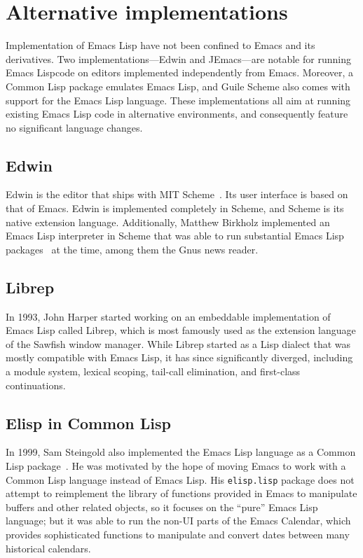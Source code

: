 \documentclass[format=acmsmall, review]{acmart}
\newcommand \Elisp {Emacs Lisp}
\begin{document}


\section{Alternative implementations}
\label{sec:alternative-implementations}

Implementation of \Elisp{} have not been confined to Emacs and its
derivatives.  Two implementations---Edwin and JEmacs---are notable for
running \Elisp code on editors implemented independently from Emacs.
Moreover, a Common Lisp package emulates Emacs Lisp, and Guile Scheme
also comes with support for the \Elisp{} language.
These implementations all aim at running existing \Elisp{}
code in alternative environments, and consequently feature no
significant language changes.

\subsection{Edwin}

Edwin is the editor that ships with MIT Scheme~\cite{MITScheme2014}.
Its user interface is based on that of Emacs.  Edwin is implemented
completely in Scheme, and Scheme is its native extension language.
Additionally, Matthew Birkholz implemented an \Elisp{} interpreter
in Scheme that was able to run substantial \Elisp{}
packages~\cite{Birkholz1993} at the time, among them the Gnus news reader.

\subsection{Librep}

In 1993, John Harper started working on an embeddable implementation of
\Elisp{} called Librep, which is most famously used as the extension
language of the Sawfish window manager.  While Librep started as a Lisp
dialect that was mostly compatible with \Elisp{}, it has since significantly
diverged, including a module system, lexical scoping, tail-call elimination,
and first-class continuations.

\subsection{Elisp in Common Lisp}

In 1999, Sam Steingold also implemented the \Elisp{} language as a Common
Lisp package~\cite{Steingold99}.  He was motivated by the hope of moving
Emacs to work with a Common Lisp language instead of \Elisp{}.
His \texttt{elisp.lisp} package does not attempt to reimplement the library
of functions provided in Emacs to manipulate buffers and other related
objects, so it focuses on the ``pure'' \Elisp{} language; but it was able to
run the non-UI parts of the Emacs Calendar, which provides sophisticated
functions to manipulate and convert dates between many historical calendars.
\end{document}
